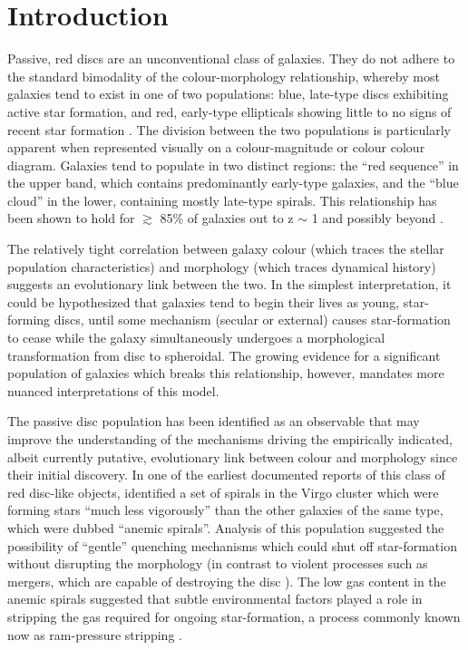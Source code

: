 \documentclass[useAMS,usenatbib]{mn2e}
\begin{document}
\section{Introduction}
\label{sec:Intro}

Passive, red discs are an unconventional class of galaxies. They do not adhere to the standard bimodality of the colour-morphology relationship, whereby most galaxies tend to exist in one of two populations: blue, late-type discs exhibiting active star formation, and red, early-type ellipticals showing little to no signs of recent star formation \citep{Strateva2001, Baldry2004, Correa2017}. The division between the two populations is particularly apparent when represented visually on a colour-magnitude or colour colour diagram. Galaxies tend to populate in two distinct regions: the ``red sequence'' in the upper band, which contains predominantly early-type galaxies, and the ``blue cloud'' in the lower, containing mostly late-type spirals. This relationship has been shown to hold for $\gtrsim$ 85\% of galaxies out to z $\sim$ 1 \citep{Bell2004,Cirasuolo2007,Mignoli2009} and possibly beyond \citep{Giallongo2005, vanDokkum2006, Franzetti2007, Cassata2008}. 

The relatively tight correlation between galaxy colour (which traces the stellar population characteristics) and morphology (which traces dynamical history) suggests an evolutionary link between the two. In the simplest interpretation, it could be hypothesized that galaxies tend to begin their lives as young, star-forming discs, until some mechanism (secular or external) causes star-formation to cease while the galaxy simultaneously undergoes a morphological transformation from disc to spheroidal. The growing evidence for a significant population of galaxies which breaks this relationship, however, mandates more nuanced interpretations of this model. 

The passive disc population has been identified as an observable that may improve the understanding of the mechanisms driving the empirically indicated, albeit currently putative, evolutionary link between colour and morphology since their initial discovery.  In one of the earliest documented reports of this class of red disc-like objects, \citet{VandenBergh1976} identified a set of spirals in the Virgo cluster which were forming stars ``much less vigorously'' than the other galaxies of the same type, which were dubbed ``anemic spirals''. Analysis of this population suggested the possibility of ``gentle'' quenching mechanisms which could shut off star-formation without disrupting the morphology (in contrast to violent processes such as mergers, which are capable of destroying the disc \citep{Bell2004,Negroponte1983,DeLucia2006,Springel2005}). The low gas content in the anemic spirals suggested that subtle environmental factors played a role in stripping the gas required for ongoing star-formation, a process commonly known now as ram-pressure stripping \citep{Gunn1972,Steinhauser2016}. 
\end{document}
